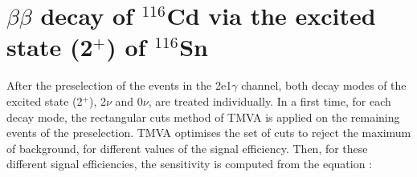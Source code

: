 \documentclass[main.tex]{subfiles}
\begin{document}


\FloatBarrier


\section{$\beta\beta$ decay of $^{\text{116}}$Cd via the excited state (2$^+$) of $^{\text{116}}$Sn}\label{sec:Result2PLUS}


\NI After the preselection of the events in the 2e1$\gamma$ channel, both decay modes of the excited state (2$^+$), 2$\nu$ and 0$\nu$, are treated individually. In a first time, for each decay mode, the rectangular cuts method of TMVA is applied on the remaining events of the preselection. TMVA optimises the set of cuts to reject the maximum of background, for different values of the signal efficiency. Then, for these different signal efficiencies, the sensitivity is computed from the equation : 
\end{document}
